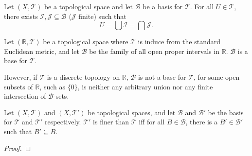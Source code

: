 \begin{corollary}
	\label{coro: alt def of basis}
	Let $(X, \mathcal T)$ be a topological space and let $\mathcal B$ be a basis for $\mathcal T$. For all $U \in \mathcal T$, there exists $\mathcal I, \mathcal J \subseteq \mathcal B$ ($\mathcal J$ finite) such that
	$$
	U = \bigcup \mathcal I = \bigcap \mathcal J.
	$$
\end{corollary}


\begin{example}
	Let $(\mathbb R, \mathcal T)$ be a topological space where $\mathcal T$ is induce from the standard Euclidean metric, and let $\mathcal B$ be the family of all open proper intervals in $\mathbb R$. $\mathcal B$ is a base for $\mathcal T$.
	
	However, if $\mathcal T$ is a discrete topology on $\mathbb R$, $\mathcal B$ is not a base for $\mathcal T$, for some open subsets of $\mathbb R$, such as $\{0\}$, is neither any arbitrary union nor any finite intersection of $\mathcal B$-sets.
\end{example}


\begin{theorem}
	Let $(X, \mathcal T)$ and $(X, \mathcal T')$ be topological spaces, and let $\mathcal B$ and $\mathcal B'$ be the basis for $\mathcal T$ and $\mathcal T'$ respectively. $\mathcal T'$ is finer than $\mathcal T$ iff for all $B \in \mathcal B$, there is a $B' \in \mathcal B'$ such that $B' \subseteq B$.
	\begin{proof}
	\end{proof}
\end{theorem}





